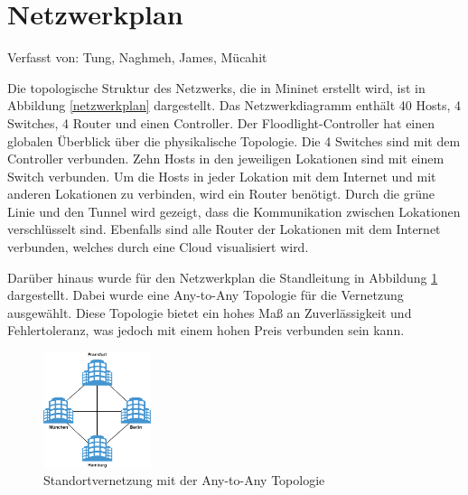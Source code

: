 \documentclass[fontsize=12pt,paper=a4,open=any,parskip=half,
  twoside=false,toc=listof,toc=bibliography,fleqn,leqno,
  captions=nooneline,captions=tableabove,british]{scrbook}
\begin{document}
\section{Netzwerkplan}
{\tiny Verfasst von: Tung, Naghmeh, James, Mücahit\par}
Die topologische Struktur des Netzwerks, die in Mininet erstellt wird, ist in Abbildung \ref{netzwerkplan} dargestellt. Das Netzwerkdiagramm enthält 40 Hosts, 4 Switches, 4 Router und einen Controller. Der Floodlight-Controller hat einen globalen Überblick über die physikalische Topologie. Die 4 Switches sind mit dem Controller verbunden. Zehn Hosts in den jeweiligen Lokationen sind mit einem Switch verbunden. Um die Hosts in jeder Lokation mit dem Internet und mit anderen Lokationen zu verbinden, wird ein Router benötigt. Durch die grüne Linie und den Tunnel wird gezeigt, dass die Kommunikation zwischen Lokationen verschlüsselt sind. Ebenfalls sind alle Router der Lokationen mit dem Internet verbunden, welches durch eine Cloud visualisiert wird.

Darüber hinaus wurde für den Netzwerkplan die Standleitung in Abbildung \ref{any-to-any} dargestellt. Dabei wurde eine Any-to-Any Topologie für die Vernetzung ausgewählt. Diese Topologie bietet ein hohes Maß an Zuverlässigkeit und Fehlertoleranz, was jedoch mit einem hohen Preis verbunden sein kann.

\begin{figure}[H]
	\centering
	\includegraphics[width=0.28\textwidth]{Bilder/any-to-any}
	\caption{Standortvernetzung mit der Any-to-Any Topologie }
	\label{any-to-any}
\end{figure}
\end{document}
